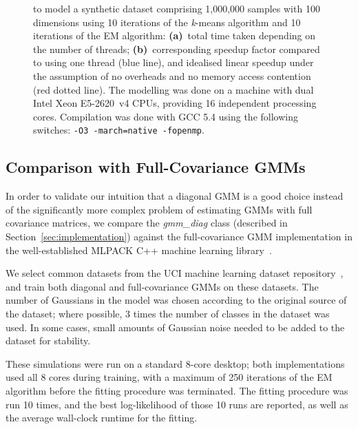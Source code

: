 \begin{figure}[!t]
{  to model a synthetic dataset comprising 1,000,000 samples with 100 dimensions
  using 10 iterations of the {\it k}-means algorithm and 10 iterations of the EM algorithm:
  {\bf (a)}~total time taken depending on the number of threads;
  {\bf (b)}~corresponding speedup factor compared to using one thread (blue line), and idealised linear speedup under the assumption of no overheads and no memory access contention (red dotted line).
  The modelling was done on a machine with dual Intel Xeon E5-2620~v4 CPUs, providing 16 independent processing cores.
  Compilation was done with GCC 5.4 using the following switches: \texttt{-O3 -march=native -fopenmp}.
  }
\label{fig:speedup}
\end{figure}


\subsection{Comparison with Full-Covariance GMMs}


In order to validate our intuition that a diagonal GMM is a good choice instead
of the significantly more complex problem of estimating GMMs with full
covariance matrices, we compare the {\it gmm\_diag} class (described in Section~\ref{sec:implementation})
against the full-covariance GMM implementation in the well-established MLPACK C++ machine learning library~\cite{Curtin_2013}.

We select common datasets from the UCI machine learning dataset
repository~\cite{Lichman_2013}, and train both diagonal and full-covariance
GMMs on these datasets.  The number of Gaussians in the model was chosen
according to the original source of the dataset; where possible, 3 times the
number of classes in the dataset was used.  In some cases, small amounts of
Gaussian noise needed to be added to the dataset for stability.

These simulations were run on a standard 8-core desktop; both implementations
used all 8 cores during training, with a maximum of 250 iterations of the EM
algorithm before the fitting procedure was terminated.  The fitting procedure
was run 10 times, and the best log-likelihood of those 10 runs are reported,
as well as the average wall-clock runtime for the fitting.


